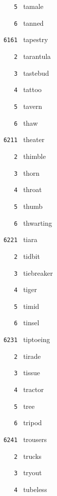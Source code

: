 \documentclass[11pt]{article}
\begin{document}
\begin{multicols}{6}
\noindent \texttt{ \ \ \ 5 } tamale  \par
\noindent \texttt{ \ \ \ 6 } tanned  \par
\vspace{3mm}
\noindent \texttt{ 6161 } tapestry  \par
\noindent \texttt{ \ \ \ 2 } tarantula  \par
\noindent \texttt{ \ \ \ 3 } tastebud  \par
\noindent \texttt{ \ \ \ 4 } tattoo  \par
\noindent \texttt{ \ \ \ 5 } tavern  \par
\noindent \texttt{ \ \ \ 6 } thaw  \par
\noindent \texttt{ 6211 } theater  \par
\noindent \texttt{ \ \ \ 2 } thimble  \par
\noindent \texttt{ \ \ \ 3 } thorn  \par
\noindent \texttt{ \ \ \ 4 } throat  \par
\noindent \texttt{ \ \ \ 5 } thumb  \par
\noindent \texttt{ \ \ \ 6 } thwarting  \par
\vspace{3mm}
\noindent \texttt{ 6221 } tiara  \par
\noindent \texttt{ \ \ \ 2 } tidbit  \par
\noindent \texttt{ \ \ \ 3 } tiebreaker  \par
\noindent \texttt{ \ \ \ 4 } tiger  \par
\noindent \texttt{ \ \ \ 5 } timid  \par
\noindent \texttt{ \ \ \ 6 } tinsel  \par
\vspace{3mm}
\noindent \texttt{ 6231 } tiptoeing  \par
\noindent \texttt{ \ \ \ 2 } tirade  \par
\noindent \texttt{ \ \ \ 3 } tissue  \par
\noindent \texttt{ \ \ \ 4 } tractor  \par
\noindent \texttt{ \ \ \ 5 } tree  \par
\noindent \texttt{ \ \ \ 6 } tripod  \par
\vspace{3mm}
\noindent \texttt{ 6241 } trousers  \par
\noindent \texttt{ \ \ \ 2 } trucks  \par
\noindent \texttt{ \ \ \ 3 } tryout  \par
\noindent \texttt{ \ \ \ 4 } tubeless  \par

\end{multicols}
\end{document}
